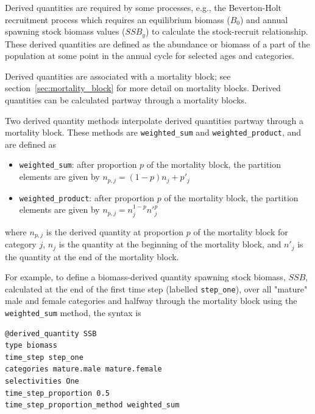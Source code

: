 Derived quantities are required by some processes, e.g., the Beverton-Holt recruitment process which requires an equilibrium biomass ($B_0$) and annual spawning stock biomass values ($SSB_y$) to calculate the stock-recruit relationship. These derived quantities are defined as the abundance or biomass of a part of the population at some point in the annual cycle for selected ages and categories.

Derived quantities are associated with a mortality block; see section~\ref{sec:mortality_block} for more detail on mortality blocks. Derived quantities can be calculated partway through a mortality blocks.

Two derived quantity methods interpolate derived quantities partway through a mortality block. These methods are \texttt{weighted\_sum} and \texttt{weighted\_product}, and are defined as

\begin{itemize}
	\item \texttt{weighted\_sum}: after proportion $p$ of the mortality block, the partition elements are given by $n_{p,j} = (1 - p)n_j + p'_j$

	\item \texttt{weighted\_product}: after proportion $p$ of the mortality block, the partition elements are given by $n_{p,j} = n_j^{1-p} n'^p_j$
\end{itemize}

where $n_{p,j}$ is the derived quantity at proportion $p$ of the mortality block for category $j$, $n_j$ is the quantity at the beginning of the mortality block, and $n'_j$ is the quantity at the end of the mortality block.

For example, to define a biomass-derived quantity spawning stock biomass, $SSB$, calculated at the end of the first time step (labelled \texttt{step\_one}), over all "mature" male and female categories and halfway through the mortality block using the \texttt{weighted\_sum} method, the syntax is

{\small{\begin{verbatim}
@derived_quantity SSB
type biomass
time_step step_one
categories mature.male mature.female
selectivities One
time_step_proportion 0.5
time_step_proportion_method weighted_sum
\end{verbatim}}}

\subsection{\label{sec:age-at-age}}


